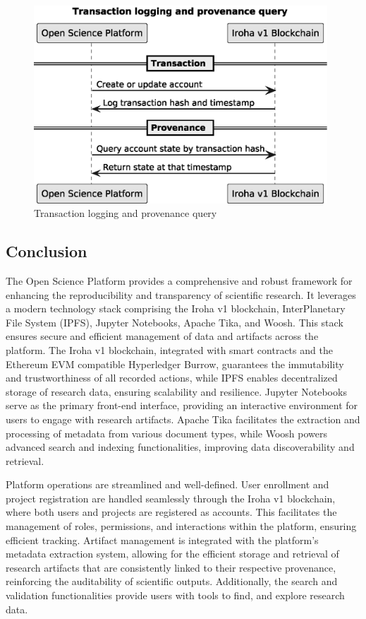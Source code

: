 \documentclass{article}
\begin{document}
\begin{figure}[htbp]
      \centering
      \includegraphics[width=0.98\textwidth, keepaspectratio]{provenance_timeline.eps}
      \caption{Transaction logging and provenance query}
      \label{fig:provenance}
\end{figure}



\subsection{Conclusion}
The Open Science Platform provides a comprehensive and robust framework for enhancing the reproducibility and transparency of scientific research. It leverages a modern technology stack comprising the Iroha v1 blockchain, InterPlanetary File System (IPFS), Jupyter Notebooks, Apache Tika, and Woosh. This stack ensures secure and efficient management of data and artifacts across the platform. The Iroha v1 blockchain, integrated with smart contracts and the Ethereum EVM compatible Hyperledger Burrow, guarantees the immutability and trustworthiness of all recorded actions, while IPFS enables decentralized storage of research data, ensuring scalability and resilience. Jupyter Notebooks serve as the primary front-end interface, providing an interactive environment for users to engage with research artifacts. Apache Tika facilitates the extraction and processing of metadata from various document types, while Woosh powers advanced search and indexing functionalities, improving data discoverability and retrieval.

Platform operations are streamlined and well-defined. User enrollment and project registration are handled seamlessly through the Iroha v1 blockchain, where both users and projects are registered as accounts. This facilitates the management of roles, permissions, and interactions within the platform, ensuring efficient tracking. Artifact management is integrated with the platform's metadata extraction system, allowing for the efficient storage and retrieval of research artifacts that are consistently linked to their respective provenance, reinforcing the auditability of scientific outputs. Additionally, the search and validation functionalities provide users with tools to find, and explore research data.
\end{document}
